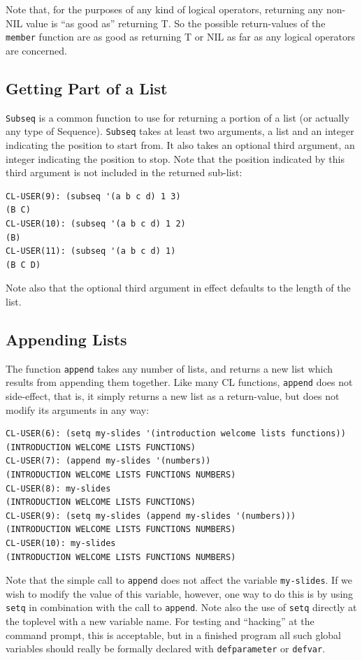 Note that, for the purposes of any kind of logical operators, returning any non-NIL value
is ``as good as'' returning T. So the possible return-values of the \texttt{member} function are as good
as returning T or NIL as far as any logical operators are concerned.

\subsection{Getting Part of a List}

\texttt{Subseq} is a common function to use for returning a portion of a list (or actually any type
of Sequence). \texttt{Subseq} takes at least two arguments, a list and an integer indicating the
position to start from. It also takes an optional third argument, an integer indicating the
position to stop. Note that the position indicated by this third argument is not included in
the returned sub-list:

\begin{verbatim}
CL-USER(9): (subseq '(a b c d) 1 3)
(B C)
CL-USER(10): (subseq '(a b c d) 1 2)
(B)
CL-USER(11): (subseq '(a b c d) 1)
(B C D)
\end{verbatim}

Note also that the optional third argument in effect defaults to the length of the list.

\subsection{Appending Lists}

The function \texttt{append} takes any number of lists, and returns a new list which results from
appending them together. Like many CL functions, \texttt{append} does not side-effect, that is, it
simply returns a new list as a return-value, but does not modify its arguments in any way:

\begin{verbatim}
CL-USER(6): (setq my-slides '(introduction welcome lists functions))
(INTRODUCTION WELCOME LISTS FUNCTIONS)
CL-USER(7): (append my-slides '(numbers))
(INTRODUCTION WELCOME LISTS FUNCTIONS NUMBERS)
CL-USER(8): my-slides
(INTRODUCTION WELCOME LISTS FUNCTIONS)
CL-USER(9): (setq my-slides (append my-slides '(numbers)))
(INTRODUCTION WELCOME LISTS FUNCTIONS NUMBERS)
CL-USER(10): my-slides
(INTRODUCTION WELCOME LISTS FUNCTIONS NUMBERS)
\end{verbatim}

Note that the simple call to \texttt{append} does not affect the variable \texttt{my-slides}. If we wish
to modify the value of this variable, however, one way to do this is by using \texttt{setq} in
combination with the call to \texttt{append}. Note also the use of \texttt{setq} directly at the toplevel with
a new variable name. For testing and ``hacking'' at the command prompt, this is acceptable,
but in a finished program all such global variables should really be formally declared with
\texttt{defparameter} or \texttt{defvar}.

